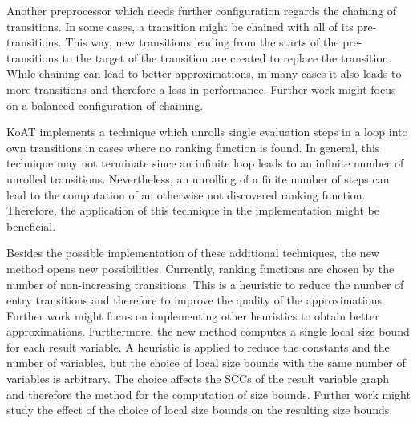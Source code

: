 Another preprocessor which needs further configuration regards the chaining of transitions.
In some cases, a transition might be chained with all of its pre-transitions.
This way, new transitions leading from the starts of the pre-transitions to the target of the transition are created to replace the transition.
While chaining can lead to better approximations, in many cases it also leads to more transitions and therefore a loss in performance.
Further work might focus on a balanced configuration of chaining.

KoAT \cite{koat} implements a technique which unrolls single evaluation steps in a loop into own transitions in cases where no ranking function is found.
In general, this technique may not terminate since an infinite loop leads to an infinite number of unrolled transitions.
Nevertheless, an unrolling of a finite number of steps can lead to the computation of an otherwise not discovered ranking function.
Therefore, the application of this technique in the implementation might be beneficial.

Besides the possible implementation of these additional techniques, the new method opens new possibilities.
Currently, ranking functions are chosen by the number of non-increasing transitions.
This is a heuristic to reduce the number of entry transitions and therefore to improve the quality of the approximations.
Further work might focus on implementing other heuristics to obtain better approximations.
Furthermore, the new method computes a single local size bound for each result variable.
A heuristic is applied to reduce the constants and the number of variables, but the choice of local size bounds with the same number of variables is arbitrary.
The choice affects the SCCs of the result variable graph and therefore the method for the computation of size bounds.
Further work might study the effect of the choice of local size bounds on the resulting size bounds.
